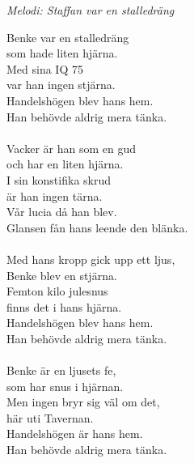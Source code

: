{\footnotesize\textit{Melodi: Staffan var en stalledräng}}\par
\vspace{10pt}
Benke var en stalledräng\\
som hade liten hjärna.\\
Med sina IQ 75\\
var han ingen stjärna.\\
Handelshögen blev hans hem.\\
Han behövde aldrig mera tänka.\\
\\
Vacker är han som en gud\\
och har en liten hjärna.\\
I sin konstifika skrud\\
är han ingen tärna.\\
Vår lucia då han blev.\\
Glansen fån hans leende den blänka.\\
\\
Med hans kropp gick upp ett ljus,\\
Benke blev en stjärna.\\
Femton kilo julesnus\\
finns det i hans hjärna.\\
Handelshögen blev hans hem.\\
Han behövde aldrig mera tänka.\\
\\
Benke är en ljusets fe,\\
som har snus i hjärnan.\\
Men ingen bryr sig väl om det,\\
här uti Tavernan.\\
Handelshögen är hans hem.\\
Han behövde aldrig mera tänka.
